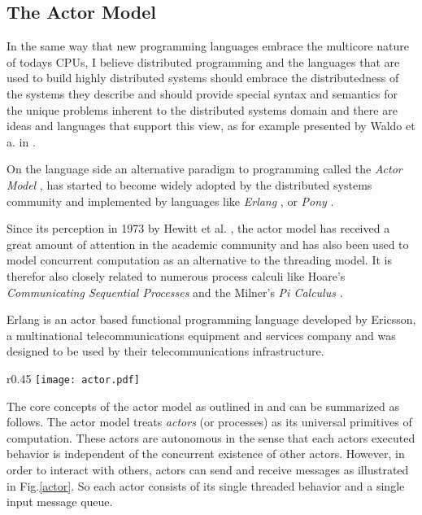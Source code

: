 \subsection{The Actor Model}
\label{actorModel}

In the same way that new programming languages embrace the multicore
nature of todays CPUs, I believe distributed programming
and the languages that are used to build highly distributed
systems should embrace the distributedness of the systems they
describe and should provide special syntax and semantics
for the unique problems inherent to the distributed systems domain
and there are ideas and languages that support this
view, as for example presented by Waldo et a. in \cite{noteondistributed}.
\newline

On the language side an alternative paradigm to programming
called the \textit{Actor Model} \cite{actors73}, \cite{actors2010}
has started to become widely adopted by the distributed systems
community and implemented by languages like
\textit{Erlang} \cite{erlang}, \cite{armstrongerlang} or
\textit{Pony} \cite{pony}.

Since its perception in 1973 by Hewitt et al. \cite{actors73},
the actor model has received a great amount of attention in the
academic community and has also been used to model concurrent
computation as an alternative to the threading model. It is therefor
also closely related to numerous process calculi like Hoare's
\textit{Communicating Sequential Processes} \cite{hoarecsp} and
the Milner's \textit{Pi Calculus} \cite{pimilner}.

Erlang is an actor based functional programming language
developed by Ericsson, a multinational telecommunications equipment
and services company and was designed to be used by their
telecommunications infrastructure.
\newline

\begin{wrapfigure}{r}{0.45\textwidth}
  \vspace{-10mm}
  \texttt{[image: actor.pdf]}
  \caption{Concept of an \textit{Actor} as \\defined by the
          actor model.}
  \label{actor}
  \vspace{-25mm}
\end{wrapfigure}

The core concepts of the actor model as outlined in \cite{actorsagha}
and \cite{actors2010}
can be summarized as follows. The actor model treats \textit{actors}
(or processes) as its universal primitives of computation.
These actors are autonomous in the sense that each actors executed
behavior is independent of the concurrent existence of other actors.
However, in order to interact with others, actors can send and receive
messages as illustrated in Fig.\ref{actor}. So each actor consists
of its single threaded behavior and a single input message queue.

